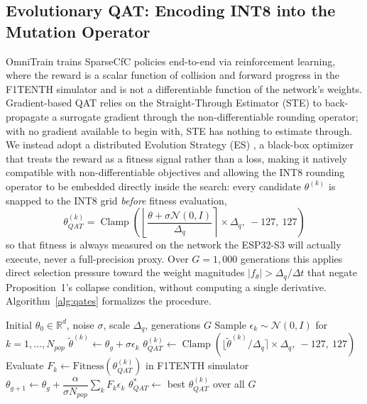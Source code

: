 \documentclass[10pt,journal]{IEEEtran}
\begin{document}
\subsection{Evolutionary QAT: Encoding INT8 into the Mutation Operator}

OmniTrain trains SparseCfC policies end-to-end via reinforcement learning, where the reward is a scalar function of collision and forward progress in the F1TENTH simulator and is not a differentiable function of the network's weights. Gradient-based QAT relies on the Straight-Through Estimator (STE) to back-propagate a surrogate gradient through the non-differentiable rounding operator; with no gradient available to begin with, STE has nothing to estimate through. We instead adopt a distributed Evolution Strategy (ES) \cite{salimans2017}, a black-box optimizer that treats the reward as a fitness signal rather than a loss, making it natively compatible with non-differentiable objectives and allowing the INT8 rounding operator to be embedded directly inside the search: every candidate $\theta^{(k)}$ is snapped to the INT8 grid \emph{before} fitness evaluation,
\begin{equation}
\theta_{QAT}^{(k)} = \operatorname{Clamp}\!\left(\left\lfloor\frac{\theta+\sigma\mathcal{N}(0,I)}{\Delta_q}\right\rceil\times\Delta_q,\ -127,\ 127\right)
\end{equation}
so that fitness is always measured on the network the ESP32-S3 will actually execute, never a full-precision proxy. Over $G=1{,}000$ generations this applies direct selection pressure toward the weight magnitudes $|f_\theta|>\Delta_q/\Delta t$ that negate Proposition~1's collapse condition, without computing a single derivative. Algorithm~\ref{alg:qates} formalizes the procedure.

\begin{algorithm}[t]
\caption{QAT-ES for SparseCfC Training}
\label{alg:qates}
\begin{algorithmic}[1]
\Require Initial $\theta_0 \in \mathbb{R}^d$, noise $\sigma$, scale $\Delta_q$, generations $G$
  \State Sample $\epsilon_k \sim \mathcal{N}(0,I)$ for $k=1,\dots,N_{pop}$
  \State $\tilde{\theta}^{(k)} \gets \theta_g + \sigma\epsilon_k$ 
  \State $\theta_{QAT}^{(k)} \gets \operatorname{Clamp}(\lfloor \tilde{\theta}^{(k)}/\Delta_q\rceil \times \Delta_q,\ -127,\ 127)$
  \State Evaluate $F_k \gets \text{Fitness}(\theta_{QAT}^{(k)})$ in F1TENTH simulator
  \State $\theta_{g+1} \gets \theta_g + \dfrac{\alpha}{\sigma N_{pop}}\sum_k F_k \epsilon_k$ 
\EndFor
\State \Return $\theta^*_{QAT} \gets$ best $\theta_{QAT}^{(k)}$ over all $G$
\end{algorithmic}
\end{algorithm}
\end{document}
